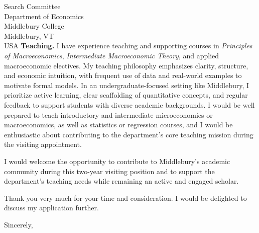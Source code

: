 \documentclass[11pt,letterpaper]{letter}
\begin{document}
\begin{letter}{Search Committee \\
Department of Economics \\
Middlebury College \\
Middlebury, VT \\ USA}
\textbf{Teaching.} I have experience teaching and supporting courses in \textit{Principles of Macroeconomics}, \textit{Intermediate Macroeconomic Theory}, and applied macroeconomic electives. My teaching philosophy emphasizes clarity, structure, and economic intuition, with frequent use of data and real-world examples to motivate formal models. In an undergraduate-focused setting like Middlebury, I prioritize active learning, clear scaffolding of quantitative concepts, and regular feedback to support students with diverse academic backgrounds. I would be well prepared to teach introductory and intermediate microeconomics or macroeconomics, as well as statistics or regression courses, and I would be enthusiastic about contributing to the department’s core teaching mission during the visiting appointment.

I would welcome the opportunity to contribute to Middlebury’s academic community during this two-year visiting position and to support the department’s teaching needs while remaining an active and engaged scholar.

Thank you very much for your time and consideration. I would be delighted to discuss my application further.

\closing{Sincerely,}

\end{letter}
\end{document}
